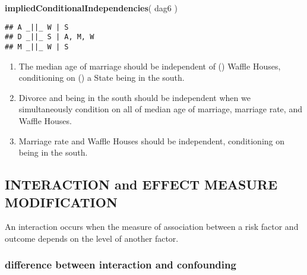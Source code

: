 \documentclass[
]{article}
\newenvironment{Shaded}{\begin{snugshade}}{\end{snugshade}}
\newcommand{\KeywordTok}[1]{\textcolor[rgb]{0.13,0.29,0.53}{\textbf{#1}}}
\newcommand{\NormalTok}[1]{#1}
\begin{document}
\begin{Shaded}
\begin{Highlighting}[]
 \KeywordTok{impliedConditionalIndependencies}\NormalTok{( dag6 )}
\end{Highlighting}
\end{Shaded}

\begin{verbatim}
## A _||_ W | S
## D _||_ S | A, M, W
## M _||_ W | S
\end{verbatim}

\begin{enumerate}
\def\labelenumi{\arabic{enumi})}
\item
  The median age of marriage should be independent of
  (\emph{\textbar\textbar{}}) Waffle Houses, conditioning on (\textbar)
  a State being in the south.
\item
  Divorce and being in the south should be independent when we
  simultaneously condition on all of median age of marriage, marriage
  rate, and Waffle Houses.
\item
  Marriage rate and Waffle Houses should be independent, conditioning on
  being in the south.
\end{enumerate}

\hypertarget{interaction-and-effect-measure-modification}{%
\subsection{INTERACTION and EFFECT MEASURE
MODIFICATION}\label{interaction-and-effect-measure-modification}}

An interaction occurs when the measure of association between a risk
factor and outcome depends on the level of another factor.

\hypertarget{difference-between-interaction-and-confounding}{%
\subsubsection{difference between interaction and
confounding}\label{difference-between-interaction-and-confounding}}
\end{document}
